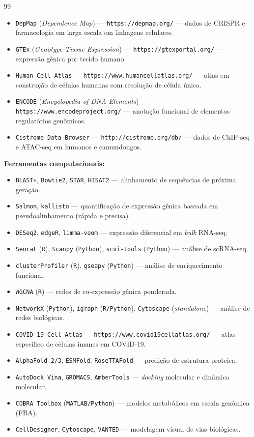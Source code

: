 \begin{thebibliography}{99}
\begin{itemize}
  \item \texttt{DepMap} (\emph{Dependence Map}) --- \texttt{https://depmap.org/} --- dados de CRISPR e farmacologia em larga escala em linhagens celulares.
  \item \texttt{GTEx} (\emph{Genotype-Tissue Expression}) --- \texttt{https://gtexportal.org/} --- expressão gênica por tecido humano.
  \item \texttt{Human Cell Atlas} --- \texttt{https://www.humancellatlas.org/} --- atlas em construção de células humanas com resolução de célula única.
  \item \texttt{ENCODE} (\emph{Encyclopedia of DNA Elements}) --- \texttt{https://www.encodeproject.org/} --- anotação funcional de elementos regulatórios genômicos.
  \item \texttt{Cistrome Data Browser} --- \texttt{http://cistrome.org/db/} --- dados de ChIP-seq e ATAC-seq em humanos e camundongos.
\end{itemize}

\textbf{Ferramentas computacionais:}
\begin{itemize}
  \item \texttt{BLAST+}, \texttt{Bowtie2}, \texttt{STAR}, \texttt{HISAT2} --- alinhamento de sequências de próxima geração.
  \item \texttt{Salmon}, \texttt{kallisto} --- quantificação de expressão gênica baseada em pseudoalinhamento (rápida e precisa).
  \item \texttt{DESeq2}, \texttt{edgeR}, \texttt{limma-voom} --- expressão diferencial em \emph{bulk} RNA-seq.
  \item \texttt{Seurat} (\texttt{R}), \texttt{Scanpy} (\texttt{Python}), \texttt{scvi-tools} (\texttt{Python}) --- análise de scRNA-seq.
  \item \texttt{clusterProfiler} (\texttt{R}), \texttt{gseapy} (\texttt{Python}) --- análise de enriquecimento funcional.
  \item \texttt{WGCNA} (\texttt{R}) --- redes de co-expressão gênica ponderada.
  \item \texttt{NetworkX} (\texttt{Python}), \texttt{igraph} (\texttt{R/Python}), \texttt{Cytoscape} (\emph{standalone}) --- análise de redes biológicas.
  \item \texttt{COVID-19 Cell Atlas} --- \texttt{https://www.covid19cellatlas.org/} --- atlas específico de células imunes em COVID-19.
  \item \texttt{AlphaFold 2/3}, \texttt{ESMFold}, \texttt{RoseTTAFold} --- predição de estrutura proteica.
  \item \texttt{AutoDock Vina}, \texttt{GROMACS}, \texttt{AmberTools} --- \emph{docking} molecular e dinâmica molecular.
  \item \texttt{COBRA Toolbox} (\texttt{MATLAB/Python}) --- modelos metabólicos em escala genômica (FBA).
  \item \texttt{CellDesigner}, \texttt{Cytoscape}, \texttt{VANTED} --- modelagem visual de vias biológicas.
\end{itemize}


\end{thebibliography}
